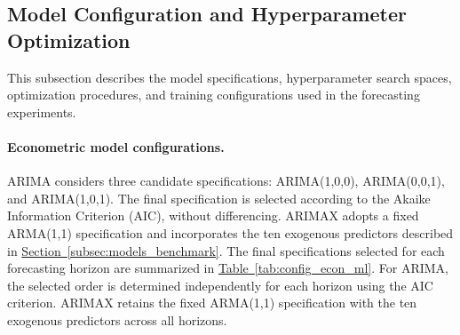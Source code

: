 \documentclass[12pt,twoside]{ord}
\begin{document}
\subsection{Model Configuration and Hyperparameter Optimization}\label{subsec:model_config}

This subsection describes the model specifications, hyperparameter search spaces, optimization procedures, and training configurations used in the forecasting experiments.

\paragraph{Econometric model configurations.} ARIMA considers three candidate specifications: ARIMA(1,0,0), ARIMA(0,0,1), and ARIMA(1,0,1). The final specification is selected according to the Akaike Information Criterion (AIC), without differencing. ARIMAX adopts a fixed ARMA(1,1) specification and incorporates the ten exogenous predictors described in \hyperref[subsec:models_benchmark]{Section~\ref*{subsec:models_benchmark}}. The final specifications selected for each forecasting horizon are summarized in \hyperref[tab:config_econ_ml]{Table~\ref*{tab:config_econ_ml}}. For ARIMA, the selected order is determined independently for each horizon using the AIC criterion. ARIMAX retains the fixed ARMA(1,1) specification with the ten exogenous predictors across all horizons.
\end{document}
